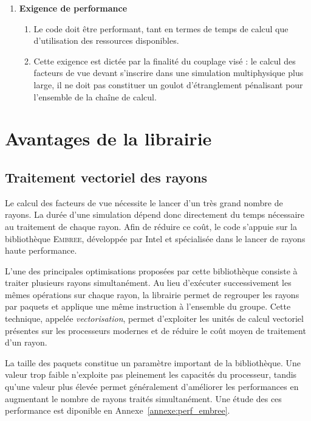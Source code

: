 \begin{enumerate}
    \item \textbf{Exigence de performance}
    \begin{enumerate}
        \item Le code doit être performant, tant en termes de temps de calcul que d'utilisation des ressources disponibles.
        \item Cette exigence est dictée par la finalité du couplage visé : le calcul des facteurs de vue devant s'inscrire dans une simulation multiphysique plus large, il ne doit pas constituer un goulot d'étranglement pénalisant pour l'ensemble de la chaîne de calcul.
    \end{enumerate}
\end{enumerate}


\section{Avantages de la librairie \emb}

\subsection{Traitement vectoriel des rayons}

Le calcul des facteurs de vue nécessite le lancer d'un très grand nombre de rayons. La durée d'une simulation dépend donc directement du temps nécessaire au traitement de chaque rayon. Afin de réduire ce coût, le code s'appuie sur la bibliothèque \textsc{Embree}, développée par Intel et spécialisée dans le lancer de rayons haute performance.

L'une des principales optimisations proposées par cette bibliothèque consiste à traiter plusieurs rayons simultanément. Au lieu d'exécuter successivement les mêmes opérations sur chaque rayon, la librairie permet de regrouper les rayons par paquets et applique une même instruction à l'ensemble du groupe. Cette technique, appelée \emph{vectorisation}, permet d'exploiter les unités de calcul vectoriel présentes sur les processeurs modernes et de réduire le coût moyen de traitement d'un rayon.

La taille des paquets constitue un paramètre important de la bibliothèque. Une valeur trop faible n'exploite pas pleinement les capacités du processeur, tandis qu'une valeur plus élevée permet généralement d'améliorer les performances en augmentant le nombre de rayons traités simultanément. Une étude des ces performance est diponible en Annexe~\ref{annexe:perf_embree}.

